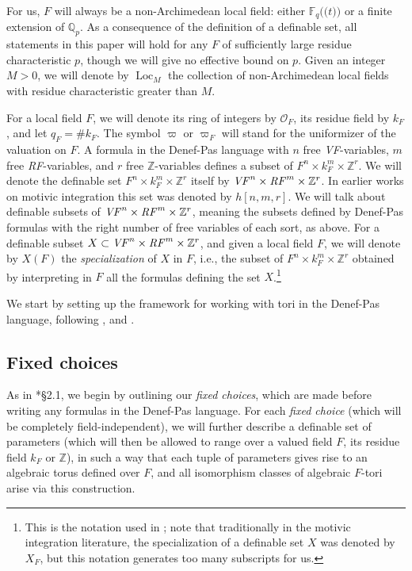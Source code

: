 \documentclass{amsart}
\newcommand{\Q}{{\mathbb Q}}
\newcommand{\F}{{\mathbb F}}
\newcommand{\Z}{{\mathbb Z}}
\newcommand{\ri}{\mathcal{O}}
\DeclareMathOperator{\loc}{Loc}
\def\llp{\mathopen{(\!(}}
\def\rrp{\mathopen{)\!)}}
\theoremstyle{plain}
\theoremstyle{definition}
\begin{document}
For us, $F$ will always be a non-Archimedean local field: either $\F_q\llp t\rrp$ or a finite extension of $\Q_p$.
As a consequence of the definition of a definable set, all statements in this paper will hold for any $F$ of sufficiently large residue characteristic $p$, 
though we will give no effective bound on $p$. 
Given an integer $M>0$, we will denote by $\loc_M$ the collection of non-Archimedean local fields
with residue characteristic greater than $M$. 

For a local field $F$, we will denote its ring of integers by $\ri_F$, its residue field by $k_F$,
and let $q_F=\# k_F$. The symbol $\varpi$ or $\varpi_F$ will stand for the uniformizer of the valuation on $F$. 
A formula in the Denef-Pas language  with $n$ free \emph{VF}-variables, $m$ free \emph{RF}-variables, and $r$ free 
$\Z$-variables 
defines a subset of $F^n\times k_F^m \times \Z^r$. 
We will denote the definable set $F^n\times k_F^m \times \Z^r$ itself by
$\mbox{\emph{VF}}^n\times \mbox{\emph{RF}}^m\times \Z^r$.
In earlier works on motivic integration this set was denoted by $h[n,m,r]$. 
We will talk about definable subsets of $\mbox{\emph{VF}}^n\times \mbox{\emph{RF}}^m\times \Z^r$,
meaning the subsets defined by Denef-Pas formulas with the right number of free variables of each sort, as above. 
For a definable subset $X\subset \mbox{\emph{VF}}^n\times \mbox{\emph{RF}}^m\times \Z^r$, and given a local field $F$,  
we will denote by $X(F)$ the \emph{specialization} of $X$ in $F$, i.e., the subset of
$F^n\times k_F^m\times \Z^r$ obtained by interpreting in $F$ all the formulas defining the set $X$.\footnote{This
is the notation used in \cite{gordon-hales:15a}; note that traditionally in the motivic integration literature,
the {specialization} of a definable set $X$ was denoted by $X_F$, but this notation generates too many subscripts for us.} 

We start by setting up the framework for working with tori in the Denef-Pas language,
following \cite{cluckers-hales-loeser}, \cite{cluckers-gordon-halupczok:14b} and \cite{gordon-hales:15a}.



\subsection{Fixed choices}\label{sub:fixedchoices}

As in \cite{gordon-hales:15a}*{\S 2.1}, we begin by outlining our \emph{fixed choices},
which are made before writing any formulas in the Denef-Pas language.  
For each \emph{fixed choice} (which will be completely field-independent), we will further describe
a definable set of parameters (which will then be allowed to range over a valued field $F$,
its residue field $k_F$ or $\Z$), in such a way that each tuple of parameters gives rise to an algebraic torus
defined over $F$, and all isomorphism classes of algebraic $F$-tori arise via this construction.
\end{document}
